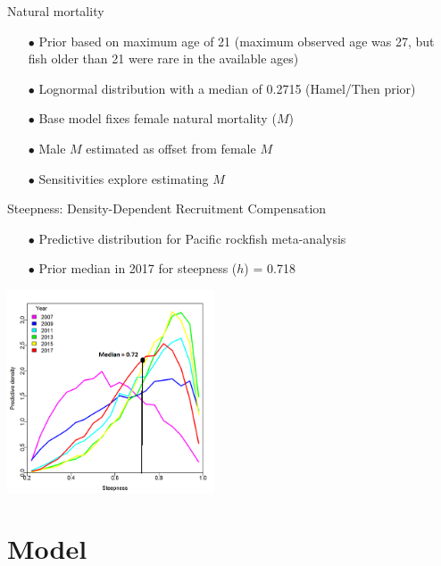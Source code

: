\documentclass[ignorenonframetext,]{beamer}
\begin{document}
\begin{frame}{Natural mortality}

\begin{itemize}
\item[$\bullet$] Prior based on maximum age of 21 (maximum observed age was 27, but fish older than 21 were rare in the available ages)
\item[$\bullet$] Lognormal distribution with a median of 0.2715 (Hamel/Then prior)
\item[$\bullet$] Base model fixes female natural mortality ($M$)
\item[$\bullet$] Male $M$ estimated as offset from female $M$
\item[$\bullet$] Sensitivities explore estimating $M$
\end{itemize}

\end{frame}

\begin{frame}{Steepness: Density-Dependent Recruitment Compensation}

\begin{itemize}
\item[$\bullet$] Predictive distribution for Pacific rockfish meta-analysis
\item[$\bullet$] Prior median in 2017 for steepness ($h$) = 0.718
\end{itemize}

\centering
\includegraphics[height=6cm]{Figures/h_prior.png}

\end{frame}

\section{Model}\label{model}
\end{document}
